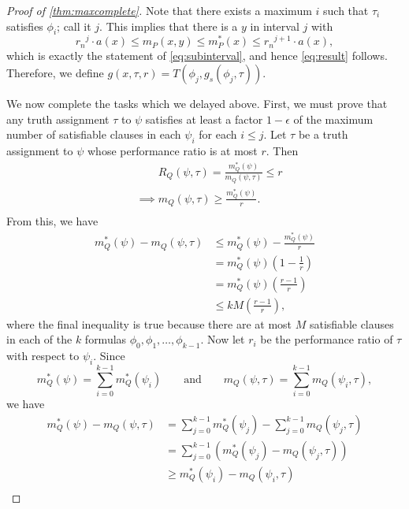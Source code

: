 \documentclass[]{article}
\theoremstyle{plain}
\theoremstyle{definition}
\begin{document}
\begin{proof}[Proof of \autoref{thm:maxcomplete}]
  Note that there exists a maximum $i$ such that $\tau_i$ satisfies $\phi_i$; call it $j$.
  This implies that there is a $y$ in interval $j$ with
  \begin{equation*}
    {r_n}^j \cdot a(x) \leq m_P(x, y) \leq m^*_P(x) \leq {r_n}^{j + 1} \cdot a(x),
  \end{equation*}
  which is exactly the statement of \autoref{eq:subinterval}, and hence \autoref{eq:result} follows.
  Therefore, we define $g(x, \tau, r) = T(\phi_j, g_s(\phi_j, \tau))$.

  We now complete the tasks which we delayed above.
  First, we must prove that any truth assignment $\tau$ to $\psi$ satisfies at least a factor $1 - \epsilon$ of the maximum number of satisfiable clauses in each $\psi_i$ for each $i \leq j$.
  Let $\tau$ be a truth assignment to $\psi$ whose performance ratio is at most $r$.
  Then
  \begin{align*}
    & \phantom{\implies} R_Q(\psi, \tau) = \frac{m^*_Q(\psi)}{m_Q(\psi, \tau)} \leq r \\
    & \implies m_Q(\psi, \tau) \geq \frac{m^*_Q(\psi)}{r}. \\
  \end{align*}
  From this, we have
  \begin{align*}
    m^*_Q(\psi) - m_Q(\psi, \tau) & \leq m^*_Q(\psi) - \frac{m^*_Q(\psi)}{r} \\
    & = m^*_Q(\psi) \left(1 - \frac{1}{r}\right) \\
    & = m^*_Q(\psi) \left(\frac{r - 1}{r}\right)\\
    & \leq kM \left(\frac{r - 1}{r}\right),
  \end{align*}
  where the final inequality is true because there are at most $M$ satisfiable clauses in each of the $k$ formulas $\phi_0, \phi_1, \dotsc, \phi_{k - 1}$.
  Now let $r_i$ be the performance ratio of $\tau$ with respect to $\psi_i$.
  Since
  \begin{equation*}
    m_Q^*(\psi) = \sum_{i = 0}^{k - 1}{m_Q^*(\psi_i)} \qquad \text{and} \qquad m_Q(\psi, \tau) = \sum_{i = 0}^{k - 1}{m_Q(\psi_i, \tau)},
  \end{equation*}
  we have
  \begin{align*}
    m^*_Q(\psi) - m_Q(\psi, \tau) & = \sum_{j = 0}^{k - 1}{m_Q^*(\psi_j)} - \sum_{j = 0}^{k - 1}{m_Q(\psi_j, \tau)} \\
    & = \sum_{j = 0}^{k - 1}{\left(m_Q^*(\psi_j) - m_Q(\psi_j, \tau)\right)} \\
    & \geq m_Q^*(\psi_i) - m_Q(\psi_i, \tau) \\

\end{align*}
\end{proof}
\end{document}
